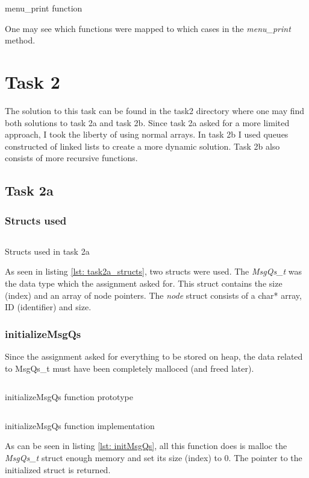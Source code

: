\documentclass[a4paper, 12pt, titlepage]{article}
\newenvironment{code}{\captionsetup{type=listing}}{}
\newcommand{\sourcecode}[3]{
    \begin{code}
      \inputminted[linenos,numbersep=5pt,gobble=0,frame=lines,framesep=2mm,]{c}{#1}
        \caption{#2}
        \label{lst: #3}
    \end{code}
}
\begin{document}
\begin{onehalfspacing}
  \sourcecode{snippets/menu_print.c}{menu\_print function}{menu_print}

  One may see which functions were mapped to which cases in the \emph{menu\_print} method.


  \clearpage

  \section{Task 2}
  The solution to this task can be found in the task2 directory where one may find both solutions to task 2a and task 2b. Since task 2a asked for a more limited approach, I took the liberty of using normal arrays. In task 2b I used queues constructed of linked lists to create a more dynamic solution. Task 2b also consists of more recursive functions.

  \subsection{Task 2a}
  \subsubsection{Structs used}

  \sourcecode{snippets/task2a_struct.c}{Structs used in task 2a}{task2a_structs}

  As seen in listing \ref{lst: task2a_structs}, two structs were used. The \emph{MsgQs\_t} was the data type which the assignment asked for. This struct contains the size (index) and an array of node pointers. The \emph{node} struct consists of a char* array, ID (identifier) and size.

  \clearpage

  \subsubsection{initializeMsgQs}
  Since the assignment asked for everything to be stored on heap, the data related to MsgQs\_t must have been completely malloced (and freed later).

  \sourcecode{snippets/initMsgQs_header.c}{initializeMsgQs function prototype}{initMsgQs_header}

  \sourcecode{snippets/initMsgQs.c}{initializeMsgQs function implementation}{initMsgQs}

  As can be seen in listing \ref{lst: initMsgQs}, all this function does is malloc the \emph{MsgQs\_t} struct enough memory and set its size (index) to 0. The pointer to the initialized struct is returned.


\end{onehalfspacing}
\end{document}
